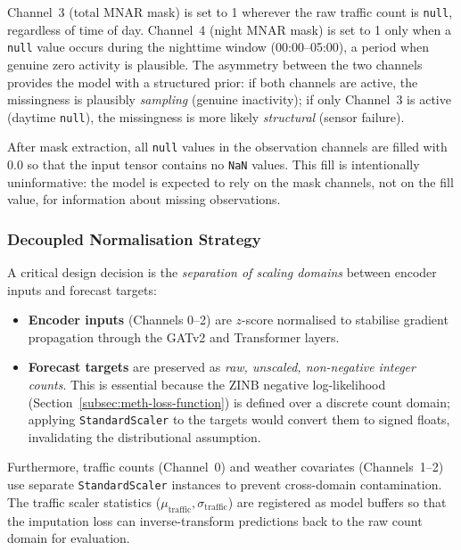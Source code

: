 Channel~3 (total MNAR mask) is set to 1 wherever the raw traffic count is \texttt{null}, regardless of time of day. Channel~4 (night MNAR mask) is set to 1 only when a \texttt{null} value occurs during the nighttime window (00:00--05:00), a period when genuine zero activity is plausible. The asymmetry between the two channels provides the model with a structured prior: if both channels are active, the missingness is plausibly \emph{sampling} (genuine inactivity); if only Channel~3 is active (daytime \texttt{null}), the missingness is more likely \emph{structural} (sensor failure).

After mask extraction, all \texttt{null} values in the observation channels are filled with $0.0$ so that the input tensor contains no \texttt{NaN} values. This fill is intentionally uninformative: the model is expected to rely on the mask channels, not on the fill value, for information about missing observations.

\subsubsection{Decoupled Normalisation Strategy}
\label{subsubsec:meth-decoupled-scaling}

A critical design decision is the \emph{separation of scaling domains} between encoder inputs and forecast targets:

\begin{itemize}
    \item \textbf{Encoder inputs} (Channels 0--2) are $z$-score normalised to stabilise gradient propagation through the GATv2 and Transformer layers.
    \item \textbf{Forecast targets} are preserved as \emph{raw, unscaled, non-negative integer counts}. This is essential because the ZINB negative log-likelihood (Section~\ref{subsec:meth-loss-function}) is defined over a discrete count domain; applying \texttt{StandardScaler} to the targets would convert them to signed floats, invalidating the distributional assumption.
\end{itemize}

\noindent Furthermore, traffic counts (Channel~0) and weather covariates (Channels~1--2) use separate \texttt{StandardScaler} instances to prevent cross-domain contamination. The traffic scaler statistics ($\mu_{\text{traffic}}, \sigma_{\text{traffic}}$) are registered as model buffers so that the imputation loss can inverse-transform predictions back to the raw count domain for evaluation.

